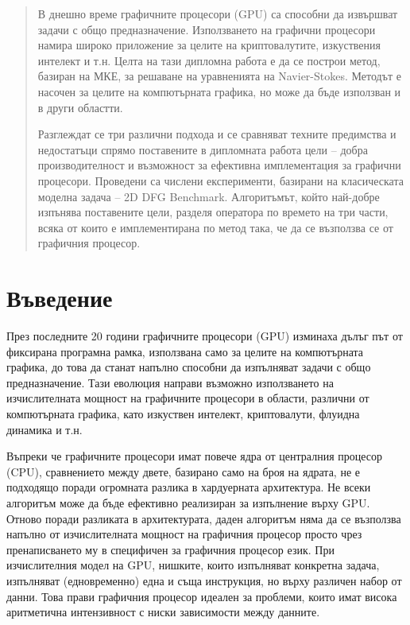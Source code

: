 \documentclass[12pt]{report}
\begin{document}
\begin{abstract}
В днешно време графичните процесори (GPU) са способни да извършват задачи с общо предназначение. Използването на графични процесори намира широко приложение за целите на криптовалутите, изкуствения интелект и т.н. Целта на тази дипломна работа е да се построи метод, базиран на МКЕ, за решаване на уравненията на Navier-Stokes. Методът е насочен за целите на компютърната графика, но може да бъде използван и в други областти.

Разглеждат се три различни подхода и се сравняват техните предимства и недостатъци спрямо поставените в дипломната работа цели -- добра производителност и възможност за ефективна имплементация за графични процесори. Проведени са числени експерименти, базирани на класическата моделна задача -- 2D DFG Benchmark. Алгоритъмът, който най-добре изпънява поставените цели, разделя оператора по времето на три части, всяка от които е имплементирана по метод така, че да се възползва се от графичния процесор.
\end{abstract}

\tableofcontents
\chapter{Въведение}
През последните 20 години графичните процесори (GPU) изминаха дълъг път от фиксирана програмна рамка, използвана само за целите на компютърната графика, до това да станат напълно способни да изпълняват задачи с общо предназначение. Тази еволюция направи възможно използването на изчислителната мощност на графичните процесори в области, различни от компютърната графика, като изкуствен интелект, криптовалути, флуидна динамика и т.н.

Въпреки че графичните процесори имат повече ядра от централния процесор (CPU), сравнението между двете, базирано само на броя на ядрата, не е подходящо поради огромната разлика в хардуерната архитектура. Не всеки алгоритъм може да бъде ефективно реализиран за изпълнение върху GPU. Отново поради разликата в архитектурата, даден алгоритъм няма да се възползва напълно от изчислителната мощност на графичния процесор просто чрез пренаписването му в специфичен за графичния процесор език. При изчислителния модел на GPU, нишките, които изпълняват конкретна задача, изпълняват (едновременно) една и съща инструкция, но върху различен набор от данни. Това прави графичния процесор идеален за проблеми, които имат висока аритметична интензивност с ниски зависимости между данните.
\end{document}
